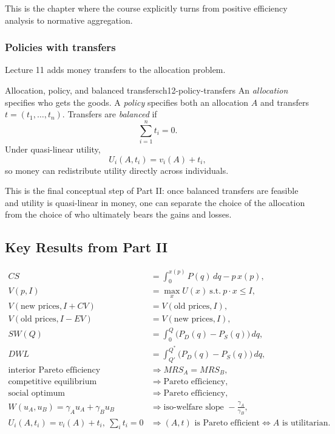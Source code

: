 This is the chapter where the course explicitly turns from positive efficiency analysis to normative aggregation.

\subsubsection{Policies with transfers}

Lecture 11 adds money transfers to the allocation problem.

\begin{definition}{Allocation, policy, and balanced transfers}{ch12-policy-transfers}
An \emph{allocation} specifies who gets the goods. A \emph{policy} specifies both an allocation \(A\) and transfers \(t=(t_1,\dots,t_n)\). Transfers are \emph{balanced} if
\[
\sum_{i=1}^n t_i=0.
\]
Under quasi-linear utility,
\[
U_i(A,t_i)=v_i(A)+t_i,
\]
so money can redistribute utility directly across individuals.
\end{definition}

This is the final conceptual step of Part II: once balanced transfers are feasible and utility is quasi-linear in money, one can separate the choice of the allocation from the choice of who ultimately bears the gains and losses.

\subsection{Key Results from Part II}

\begin{keyformula}[title={Key Formula: Part II Master Summary}]
\begin{align*}
CS &= \int_0^{x(p)} P(q)\,dq-p\,x(p), \\
V(p,I) &= \max_x U(x)\ \text{s.t.}\ p\cdot x\le I, \\
V(\text{new prices},I+CV) &= V(\text{old prices},I), \\
V(\text{old prices},I-EV) &= V(\text{new prices},I), \\
SW(Q) &= \int_0^Q \bigl(P_D(q)-P_S(q)\bigr)\,dq, \\
DWL &= \int_{Q'}^{Q^*} \bigl(P_D(q)-P_S(q)\bigr)\,dq, \\
\text{interior Pareto efficiency} &\Rightarrow MRS_A=MRS_B, \\
\text{competitive equilibrium} &\Rightarrow \text{Pareto efficiency}, \\
\text{social optimum} &\Rightarrow \text{Pareto efficiency}, \\
W(u_A,u_B)=\gamma_A u_A+\gamma_B u_B &\Rightarrow \text{iso-welfare slope } -\frac{\gamma_A}{\gamma_B}, \\
U_i(A,t_i)=v_i(A)+t_i,\ \sum_i t_i=0
&\Rightarrow
(A,t)\text{ is Pareto efficient} \iff A\text{ is utilitarian.}
\end{align*}
\end{keyformula}

